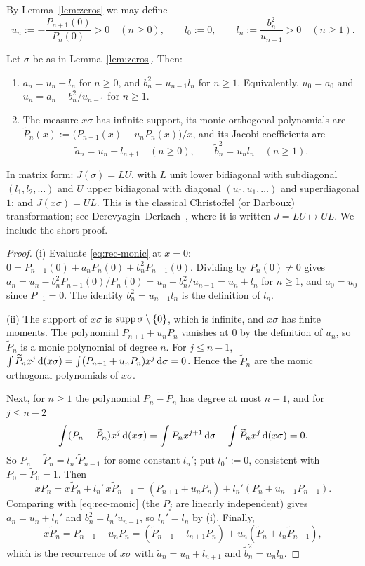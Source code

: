 By Lemma~\ref{lem:zeros} we may define
\[
  u_n:=-\frac{P_{n+1}(0)}{P_n(0)}>0\quad(n\ge0),\qquad l_0:=0,\qquad l_n:=\frac{b_n^2}{u_{n-1}}>0\quad(n\ge1).
\]

\begin{lemma}\label{lem:transfer}
Let $\sigma$ be as in Lemma~\ref{lem:zeros}. Then:
\begin{enumerate}
\item[\textup{(i)}] $a_n=u_n+l_n$ for $n\ge0$, and $b_n^2=u_{n-1}l_n$ for $n\ge1$. Equivalently, $u_0=a_0$ and
  $u_n=a_n-b_n^2/u_{n-1}$ for $n\ge1$.
\item[\textup{(ii)}] The measure $x\sigma$ has infinite support, its monic orthogonal polynomials are
  $\widetilde P_n(x):=\bigl(P_{n+1}(x)+u_nP_n(x)\bigr)/x$, and its Jacobi coefficients are
  \begin{equation}\label{eq:transfer}
    \tilde a_n=u_n+l_{n+1}\quad(n\ge0),\qquad \tilde b_n^2=u_nl_n\quad(n\ge1).
  \end{equation}
\end{enumerate}
\end{lemma}

In matrix form: $J(\sigma)=LU$, with $L$ unit lower bidiagonal with subdiagonal $(l_1,l_2,\dots)$ and $U$ upper
bidiagonal with diagonal $(u_0,u_1,\dots)$ and superdiagonal $1$; and $J(x\sigma)=UL$. This is the classical Christoffel
(or Darboux) transformation; see Derevyagin--Derkach~\cite[\S1]{DD}, where it is written $J=LU\mapsto UL$. We include
the short proof.

\begin{proof}
(i) Evaluate \eqref{eq:rec-monic} at $x=0$: $0=P_{n+1}(0)+a_nP_n(0)+b_n^2P_{n-1}(0)$. Dividing by $P_n(0)\ne0$ gives
$a_n=u_n-b_n^2P_{n-1}(0)/P_n(0)=u_n+b_n^2/u_{n-1}=u_n+l_n$ for $n\ge1$, and $a_0=u_0$ since $P_{-1}=0$. The identity
$b_n^2=u_{n-1}l_n$ is the definition of $l_n$.

(ii) The support of $x\sigma$ is $\operatorname{supp}\sigma\setminus\{0\}$, which is infinite, and $x\sigma$ has finite moments. The
polynomial $P_{n+1}+u_nP_n$ vanishes at $0$ by the definition of $u_n$, so $\widetilde P_n$ is a monic polynomial of
degree $n$. For $j\le n-1$, $\int\widetilde P_nx^j\,\mathrm{d}(x\sigma)=\int(P_{n+1}+u_nP_n)x^j\,\mathrm{d}\sigma=0$. Hence the
$\widetilde P_n$ are the monic orthogonal polynomials of $x\sigma$.

Next, for $n\ge1$ the polynomial $P_n-\widetilde P_n$ has degree at most $n-1$, and for $j\le n-2$
\[
  \int(P_n-\widetilde P_n)x^j\,\mathrm{d}(x\sigma)=\int P_nx^{j+1}\,\mathrm{d}\sigma-\int\widetilde P_nx^j\,\mathrm{d}(x\sigma)=0 .
\]
So $P_n-\widetilde P_n=l_n'\widetilde P_{n-1}$ for some constant $l_n'$; put $l_0':=0$, consistent with
$P_0=\widetilde P_0=1$. Then
\[
  xP_n=x\widetilde P_n+l_n'\,x\widetilde P_{n-1}=(P_{n+1}+u_nP_n)+l_n'(P_n+u_{n-1}P_{n-1}).
\]
Comparing with \eqref{eq:rec-monic} (the $P_j$ are linearly independent) gives $a_n=u_n+l_n'$ and $b_n^2=l_n'u_{n-1}$,
so $l_n'=l_n$ by (i). Finally,
\[
  x\widetilde P_n=P_{n+1}+u_nP_n=(\widetilde P_{n+1}+l_{n+1}\widetilde P_n)+u_n(\widetilde P_n+l_n\widetilde P_{n-1}),
\]
which is the recurrence of $x\sigma$ with $\tilde a_n=u_n+l_{n+1}$ and $\tilde b_n^2=u_nl_n$.
\end{proof}

